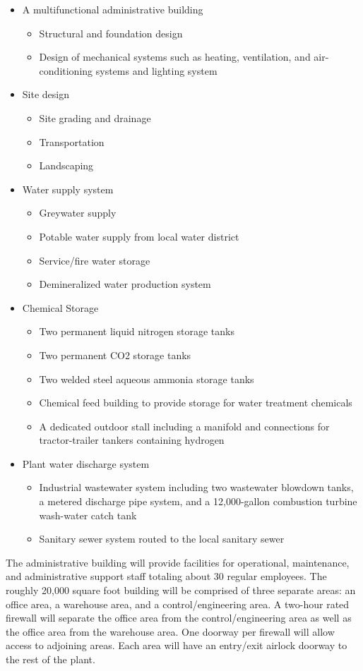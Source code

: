\documentclass{ceri}
\begin{document}
\begin{itemize}
\item 	A multifunctional administrative building 	
\begin{itemize}
\item Structural and foundation design
\item 	Design of mechanical systems such as heating, ventilation, and air-conditioning systems and lighting system
\end{itemize}
\item 	Site design
\begin{itemize}
\item 	Site grading and drainage
\item 	Transportation
\item 	Landscaping
\end{itemize}
\item 	Water supply system
\begin{itemize}
\item Greywater supply
\item 	Potable water supply from local water district
\item 	Service/fire water storage
\item 	Demineralized water production system
\end{itemize}
\item 	Chemical Storage	
\begin{itemize}
\item Two permanent liquid nitrogen storage tanks
\item 	Two permanent CO2 storage tanks
\item 	Two welded steel aqueous ammonia storage tanks
\item 	Chemical feed building to provide storage for water treatment chemicals
\item 	A dedicated outdoor stall including a manifold and connections for tractor-trailer tankers containing hydrogen
\end{itemize}
\item 	Plant water discharge system
\begin{itemize}
\item 	Industrial wastewater system including two wastewater blowdown tanks, a metered discharge pipe system, and a 12,000-gallon combustion turbine wash-water catch tank
\item  	Sanitary sewer system routed to the local sanitary sewer
\newline
\end{itemize}
\end{itemize}
\newpage
The administrative building will provide facilities for operational, maintenance, and administrative support staff totaling about 30 regular employees. The roughly 20,000 square foot building will be comprised of three separate areas: an office area, a warehouse area, and a control/engineering area. A two-hour rated firewall will separate the office area from the control/engineering area as well as the office area from the warehouse area. One doorway per firewall will allow access to adjoining areas. Each area will have an entry/exit airlock doorway to the rest of the plant.\\
\newline
\end{document}
